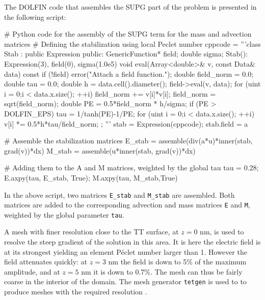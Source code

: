 The DOLFIN code that assembles the SUPG part of the problem is
presented in the following script:
\begin{python}
# Python code for the assembly of the SUPG term for the mass and advection matrices
# Defining the stabilization using local Peclet number
cppcode = '''class Stab : public Expression {
public:
  GenericFunction* field; double sigma;
  Stab(): Expression(3), field(0), sigma(1.0e5){}
  void eval(Array<double>& v, const Data& data) const {
    if (!field)
      error("Attach a field function.");
    double field_norm = 0.0; double tau = 0.0;
    double h = data.cell().diameter();
    field->eval(v, data);
    for (uint i = 0;i < data.x.size(); ++i)
      field_norm += v[i]*v[i];
    field_norm = sqrt(field_norm);
    double PE = 0.5*field_norm * h/sigma;
    if (PE > DOLFIN_EPS)
      tau = 1/tanh(PE)-1/PE;
    for (uint i = 0;i < data.x.size(); ++i)
      v[i] *= 0.5*h*tau/field_norm;
}};
'''
stab = Expression(cppcode); stab.field = a

# Assemble the stabilization matrices
E_stab = assemble(div(a*u)*inner(stab, grad(v))*dx)
M_stab = assemble(u*inner(stab, grad(v))*dx)

# Adding them to the A and M matrices, weighted by the global tau
tau = 0.28; E.axpy(tau, E_stab, True); M.axpy(tau, M_stab,True)
\end{python}
In the above script, two matrices \texttt{E\_stab} and
\texttt{M\_stab} are assembled. Both matrices are added to the
corresponding advection and mass matrices \texttt{E} and \texttt{M},
weighted by the global parameter \texttt{tau}.

A mesh with finer resolution close to the TT surface, at $z=0$ nm, is
used to resolve the steep gradient of the solution in this area. It is
here the electric field is at its strongest yielding an element
P\'eclet number larger than 1. However the field attenuates quickly: at
$z=3$ nm the field is down to 5\% of the maximum amplitude, and at
$z=5$ nm it is down to 0.7\%. The mesh can thus be fairly coarse in
the interior of the domain. The mesh generator \texttt{tetgen} is used
to to produce meshes with the required resolution \citep{Si2007}.

